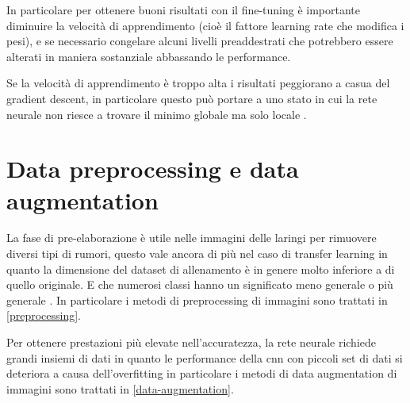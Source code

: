 In particolare per ottenere buoni risultati con il fine-tuning è importante diminuire la velocità di apprendimento (cioè il fattore learning rate che modifica i pesi), e se necessario congelare alcuni livelli preaddestrati che potrebbero essere alterati in maniera sostanziale abbassando le performance.

Se la velocità di apprendimento è troppo alta i risultati peggiorano a casua del gradient descent, in particolare questo può portare a uno stato in cui la rete neurale non riesce a trovare il minimo globale ma solo locale \cite{joel_ft_tl_lfs} \cite{joel_tl}.

\section{Data preprocessing e data augmentation}\label{data-pre-processing-e-augmentation-processing}

La fase di pre-elaborazione è utile nelle immagini delle laringi per rimuovere diversi tipi di rumori, questo vale ancora di più nel caso di transfer learning in quanto la dimensione del dataset di allenamento è in genere molto inferiore a di quello originale. E che numerosi classi hanno un significato meno generale o più generale \cite{joel_tl}. In particolare i metodi di preprocessing di immagini sono trattati in \cref{preprocessing}.

Per ottenere prestazioni più elevate nell'accuratezza, la rete neurale richiede grandi insiemi di dati in quanto le performance della \gls{cnn} con piccoli set di dati si deteriora  a causa dell'\gls{overfitting} \cite{joel_tl} in particolare i metodi di data augmentation di immagini sono trattati in \cref{data-augmentation}.





